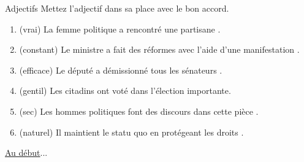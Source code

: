 \begin{frame}{Adjectifs}
  Mettez l'adjectif dans sa place avec le bon accord.
  \begin{enumerate}
    \item (vrai) La femme politique a rencontré une \underline{} partisane \underline{\hspace{1.25cm}}.
    \item (constant) Le ministre a fait des réformes avec l'aide d'une \underline{\hspace{1.25cm}} manifestation \underline{}.
    \item (efficace) Le député a démissionné tous les \underline{\hspace{1.25cm}} sénateurs \underline{}.
    \item (gentil) Les \underline{} citadins \underline{\hspace{1.25cm}} ont voté dans l'élection importante.
    \item (sec) Les hommes politiques font des discours dans cette \underline{\hspace{1.25cm}} pièce \underline{}.
    \item (naturel) Il maintient le statu quo en protégeant les \underline{\hspace{1.25cm}} droits \underline{}.
  \end{enumerate}
  \raggedleft
  \hyperlink{début}{Au début}...
\end{frame}